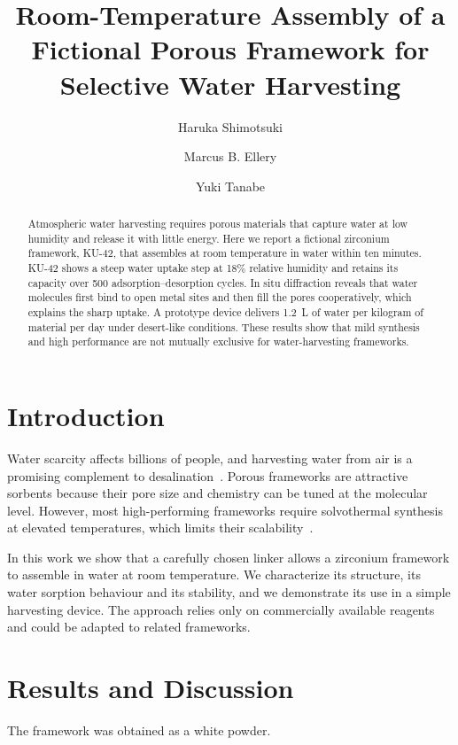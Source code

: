 \documentclass[journal=jacsat,manuscript=article]{achemso}
\author{Haruka Shimotsuki}
\affiliation[Kitamachi University]{Department of Chemistry, Kitamachi University, Kitamachi 100-0000, Japan}
\author{Marcus B. Ellery}
\affiliation[Westbrook Institute]{Department of Chemistry, Westbrook Institute of Technology, Westbrook 00000, Freedonia}
\author{Yuki Tanabe}
\affiliation[Kitamachi University]{Department of Chemistry, Kitamachi University, Kitamachi 100-0000, Japan}
\title{Room-Temperature Assembly of a Fictional Porous Framework for Selective Water Harvesting}
\begin{document}
\begin{abstract}
Atmospheric water harvesting requires porous materials that capture water at low humidity and release it with little energy.
Here we report a fictional zirconium framework, KU-42, that assembles at room temperature in water within ten minutes.
KU-42 shows a steep water uptake step at 18\% relative humidity and retains its capacity over 500 adsorption--desorption cycles.
In situ diffraction reveals that water molecules first bind to open metal sites and then fill the pores cooperatively, which explains the sharp uptake.
A prototype device delivers 1.2~L of water per kilogram of material per day under desert-like conditions.
These results show that mild synthesis and high performance are not mutually exclusive for water-harvesting frameworks.
\end{abstract}
\section{Introduction}
Water scarcity affects billions of people, and harvesting water from air is a promising complement to desalination~\cite{shimotsuki2021,ellery2022}.
Porous frameworks are attractive sorbents because their pore size and chemistry can be tuned at the molecular level.
However, most high-performing frameworks require solvothermal synthesis at elevated temperatures, which limits their scalability~\cite{tanabe2023}.

In this work we show that a carefully chosen linker allows a zirconium framework to assemble in water at room temperature.
We characterize its structure, its water sorption behaviour and its stability, and we demonstrate its use in a simple harvesting device.
The approach relies only on commercially available reagents and could be adapted to related frameworks.

\section{Results and Discussion}
The framework was obtained as a white powder.

\end{document}
